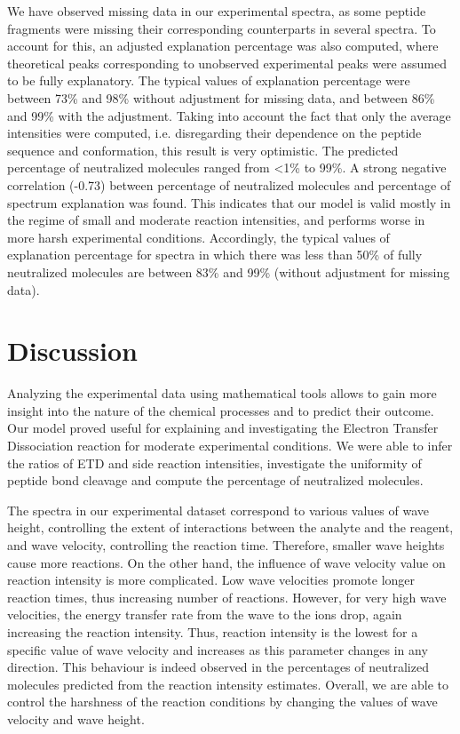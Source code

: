 \documentclass{llncs}
\begin{document}
	We have observed missing data in our experimental spectra, as some peptide fragments were missing their corresponding counterparts in several spectra. To account for this, an adjusted explanation percentage was also computed, where theoretical peaks corresponding to unobserved experimental peaks were assumed to be fully explanatory.
	The typical values of explanation percentage were between 73\% and 98\% without adjustment for missing data, and between 86\% and 99\% with the adjustment. Taking into account the fact that only the average intensities were computed, i.e. disregarding their dependence on the peptide sequence and conformation, this result is very optimistic.
	The predicted percentage of neutralized molecules ranged from <1\% to 99\%.  A strong negative correlation (-0.73) between percentage of neutralized molecules and percentage of spectrum explanation was found. This indicates that our model is valid mostly in the regime of small and moderate reaction intensities, and performs worse in more harsh experimental conditions. Accordingly, the typical values of explanation percentage for spectra in which there was less than 50\% of fully neutralized molecules are between 83\% and 99\% (without adjustment for missing data).

\section{Discussion}
        Analyzing the experimental data using mathematical tools allows to gain more insight into the nature of the chemical processes and to predict their outcome. Our model proved useful for explaining and investigating the Electron Transfer Dissociation reaction for moderate experimental conditions. We were able to infer the ratios of ETD and side reaction intensities, investigate the uniformity of peptide bond cleavage and compute the percentage of neutralized molecules.

        The spectra in our experimental dataset correspond to various values of wave height, controlling the extent of interactions between the analyte and the reagent, and wave velocity, controlling the reaction time. Therefore, smaller wave heights cause more reactions. On the other hand, the influence of wave velocity value on reaction intensity is more complicated. Low wave velocities promote longer reaction times, thus increasing number of reactions. However, for very high wave velocities, the energy transfer rate from the wave to the ions drop, again increasing the reaction intensity. Thus, reaction intensity is the lowest for a specific value of wave velocity and increases as this parameter changes in any direction. This behaviour is indeed observed in the percentages of neutralized molecules predicted from the reaction intensity estimates. Overall, we are able to control the harshness of the reaction conditions by changing the values of wave velocity and wave height.
\end{document}
